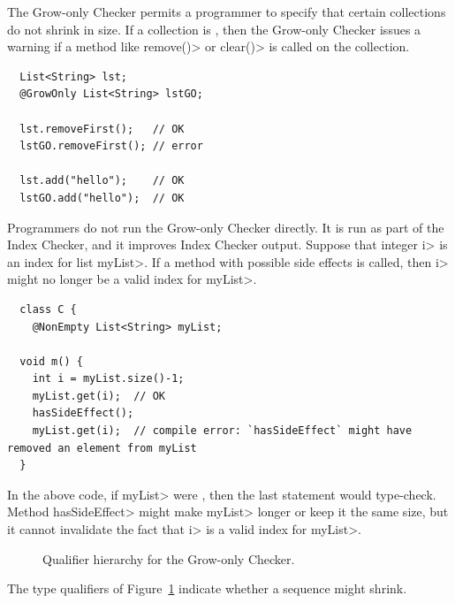 \iffalse %

The Grow-only Checker permits a programmer to specify that certain
collections do not shrink in size.  If a collection is
, then the Grow-only Checker
issues a warning if a method like \<remove()> or \<clear()> is called
on the collection.

\begin{Verbatim}
  List<String> lst;
  @GrowOnly List<String> lstGO;

  lst.removeFirst();   // OK
  lstGO.removeFirst(); // error

  lst.add("hello");    // OK
  lstGO.add("hello");  // OK
\end{Verbatim}


Programmers do not run the Grow-only Checker directly.  It is run as part of
the Index Checker, and it improves Index Checker output.  Suppose that integer
\<i> is an index for list \<myList>.  If a method with possible side effects is
called, then \<i> might no longer be a valid index for \<myList>.

\begin{Verbatim}
  class C {
    @NonEmpty List<String> myList;

  void m() {
    int i = myList.size()-1;
    myList.get(i);  // OK
    hasSideEffect();
    myList.get(i);  // compile error: `hasSideEffect` might have removed an element from myList
  }
\end{Verbatim}

In the above code, if \<myList> were
, then the last statement would
type-check.  Method \<hasSideEffect> might make \<myList> longer or keep it the
same size, but it cannot invalidate the fact that \<i> is a valid index for
\<myList>.

\begin{figure}
\begin{center}
\end{center}
\caption{Qualifier hierarchy for the Grow-only Checker.}
\label{growonly-mutability-lattice}
\end{figure}

The type qualifiers of Figure~\ref{growonly-mutability-lattice} indicate whether
a sequence might shrink.


